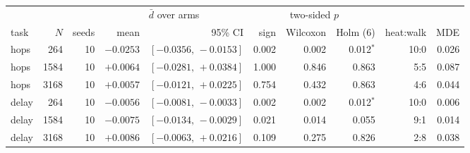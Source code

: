 {\footnotesize\setlength{\tabcolsep}{3.5pt}
\begin{tabular}{@{}lrrrrrrrrr@{}}
\toprule
& & & \multicolumn{2}{c}{$\bar d$ over arms} & \multicolumn{3}{c}{two-sided $p$} & & \\
\cmidrule(lr){4-5}\cmidrule(lr){6-8}
task & $N$ & seeds & mean & 95\% CI & sign & Wilcoxon & Holm (6) & heat:walk & MDE \\
\midrule
hops & 264 & 10 & $-0.0253$ & $[-0.0356,\,-0.0153]$ & 0.002 & 0.002 & 0.012$^{*}$ & 10:0 & 0.026 \\
hops & 1584 & 10 & $+0.0064$ & $[-0.0281,\,+0.0384]$ & 1.000 & 0.846 & 0.863 & 5:5 & 0.087 \\
hops & 3168 & 10 & $+0.0057$ & $[-0.0121,\,+0.0225]$ & 0.754 & 0.432 & 0.863 & 4:6 & 0.044 \\
delay & 264 & 10 & $-0.0056$ & $[-0.0081,\,-0.0033]$ & 0.002 & 0.002 & 0.012$^{*}$ & 10:0 & 0.006 \\
delay & 1584 & 10 & $-0.0075$ & $[-0.0134,\,-0.0029]$ & 0.021 & 0.014 & 0.055 & 9:1 & 0.014 \\
delay & 3168 & 10 & $+0.0086$ & $[-0.0063,\,+0.0216]$ & 0.109 & 0.275 & 0.826 & 2:8 & 0.038 \\
\bottomrule
\end{tabular}
}

